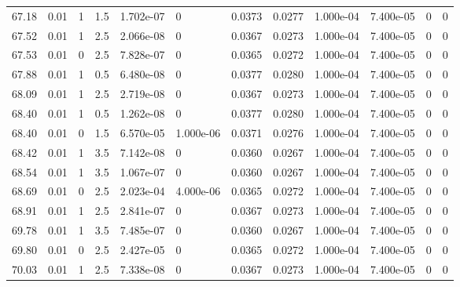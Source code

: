 \documentclass[preview]{standalone}
\begin{document}
{{{{{{{\begin{tabular}{L{1.2cm}C{1.2cm} C{0.3cm}C{0.5cm} C{1.4cm}C{1.4cm} C{1.4cm}C{1.4cm} C{1.6cm}C{1.6cm} C{1.6cm}C{1.6cm}}
  67.18  &  0.01  & 1     & 1.5 &  1.702e-07  & 0  &  0.0373&   0.0277& 1.000e-04 & 7.400e-05   &  0 & 0  \\ 
  67.52  &  0.01  & 1     & 2.5 &  2.066e-08  & 0  &  0.0367&   0.0273& 1.000e-04 & 7.400e-05   &  0 & 0  \\ 
  67.53  &  0.01  & 0     & 2.5 &  7.828e-07  & 0  &  0.0365&   0.0272& 1.000e-04 & 7.400e-05   &  0 & 0  \\ 
  67.88  &  0.01  & 1     & 0.5 &  6.480e-08  & 0  &  0.0377&   0.0280& 1.000e-04 & 7.400e-05   &  0 & 0  \\ 
  68.09  &  0.01  & 1     & 2.5 &  2.719e-08  & 0  &  0.0367&   0.0273& 1.000e-04 & 7.400e-05   &  0 & 0  \\ 
  68.40  &  0.01  & 1     & 0.5 &  1.262e-08  & 0  &  0.0377&   0.0280& 1.000e-04 & 7.400e-05   &  0 & 0  \\ 
  68.40  &  0.01  & 0     & 1.5 &  6.570e-05  & 1.000e-06  &  0.0371&   0.0276& 1.000e-04 & 7.400e-05   &  0 & 0  \\ 
  68.42  &  0.01  & 1     & 3.5 &  7.142e-08  & 0  &  0.0360&   0.0267& 1.000e-04 & 7.400e-05   &  0 & 0  \\ 
  68.54  &  0.01  & 1     & 3.5 &  1.067e-07  & 0  &  0.0360&   0.0267& 1.000e-04 & 7.400e-05   &  0 & 0  \\ 
  68.69  &  0.01  & 0     & 2.5 &  2.023e-04  & 4.000e-06  &  0.0365&   0.0272& 1.000e-04 & 7.400e-05   &  0 & 0  \\ 
  68.91  &  0.01  & 1     & 2.5 &  2.841e-07  & 0  &  0.0367&   0.0273& 1.000e-04 & 7.400e-05   &  0 & 0  \\ 
  69.78  &  0.01  & 1     & 3.5 &  7.485e-07  & 0  &  0.0360&   0.0267& 1.000e-04 & 7.400e-05   &  0 & 0  \\ 
  69.80  &  0.01  & 0     & 2.5 &  2.427e-05  & 0  &  0.0365&   0.0272& 1.000e-04 & 7.400e-05   &  0 & 0  \\ 
  70.03  &  0.01  & 1     & 2.5 &  7.338e-08  & 0  &  0.0367&   0.0273& 1.000e-04 & 7.400e-05   &  0 & 0  \\ 
\hline 
\end{tabular} 

}}}}}}}
\end{document}
